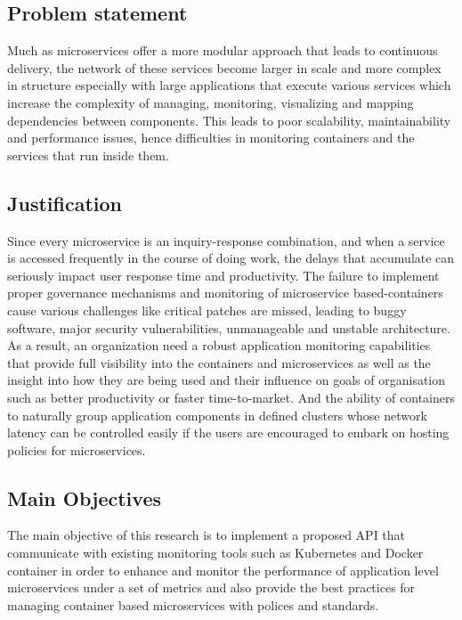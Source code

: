 \documentclass{article}
\begin{document}
\subsection{Problem statement }
Much as microservices offer a more modular approach that leads to continuous delivery, the network of these services become larger in scale and more complex in structure especially with large applications that execute various services which increase the complexity of managing, monitoring, visualizing and mapping dependencies between components. This leads to poor scalability, maintainability and performance issues, hence difficulties in monitoring containers and the services that run inside them.

\subsection{Justification }

Since every microservice is an inquiry-response combination, and when a service is accessed frequently in the course of doing work, the delays that accumulate can seriously impact user response time and productivity. The failure to implement proper governance mechanisms and monitoring of microservice based-containers cause various challenges like critical patches are missed, leading to buggy software, major security vulnerabilities, unmanageable and unstable architecture. As a result, an organization need a robust application monitoring capabilities that provide full visibility into the containers and microservices as well as the insight into how they are being used and their influence on goals of organisation such as better productivity or faster time-to-market.  And the ability of containers to naturally group application components in defined clusters whose network latency can be controlled easily if the users are encouraged to embark on hosting policies for microservices.

\subsection{Main Objectives }

The main objective of this research is to implement a proposed API that communicate with existing monitoring tools such as Kubernetes and Docker container in order to enhance and monitor the performance of application level microservices under a set of metrics and also provide the best practices for managing container based microservices  with polices and standards.
\end{document}
